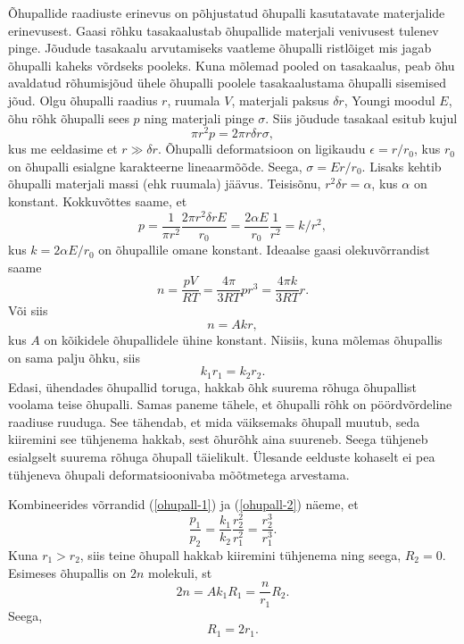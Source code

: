 \documentclass[10pt]{article}
\begin{document}
\solu
Õhupallide raadiuste erinevus on põhjustatud õhupalli kasutatavate materjalide erinevusest. Gaasi rõhku tasakaalustab õhupallide materjali venivusest tulenev pinge. Jõudude tasakaalu arvutamiseks vaatleme õhupalli ristlõiget mis jagab õhupalli kaheks võrdseks pooleks. Kuna mõlemad pooled on tasakaalus, peab õhu avaldatud rõhumisjõud ühele õhupalli poolele tasakaalustama õhupalli sisemised jõud. Olgu õhupalli raadius $r$, ruumala $V$, materjali paksus $\delta r$, Youngi moodul $E$, õhu rõhk õhupalli sees $p$ ning materjali pinge $\sigma$. Siis jõudude tasakaal esitub kujul
\[
\pi r^2 p = 2\pi r\delta r \sigma,
\]
kus me eeldasime et $r \gg \delta r$. Õhupalli deformatsioon on ligikaudu $\epsilon = r / r_0$, kus $r_0$ on õhupalli esialgne karakteerne lineaarmõõde. Seega, $\sigma = Er/r_0$. Lisaks kehtib õhupalli materjali massi (ehk ruumala) jäävus. Teisisõnu, $r^2\delta r = \alpha$, kus $\alpha$ on konstant. Kokkuvõttes saame, et
\begin{equation}
p = \frac{1}{\pi r^2} \frac{2\pi r^2\delta rE}{r_0} = \frac{2\alpha E}{r_0}\frac{1}{r^2}  = k/r^2,
\label{ohupall-1}
\end{equation}
kus $k = 2\alpha E/r_0$ on õhupallile omane konstant. Ideaalse gaasi olekuvõrrandist saame
\[
n = \frac{pV}{RT} = \frac{4\pi}{3RT}pr^3 = \frac{4\pi k}{3RT}r.
\]
Või siis
\[
n = Akr,
\]
kus $A$ on kõikidele õhupallidele ühine konstant. Niisiis, kuna mõlemas õhupallis on sama palju õhku, siis
\begin{equation}
k_1r_1 = k_2r_2.
\label{ohupall-2}
\end{equation}
Edasi, ühendades õhupallid toruga, hakkab õhk suurema rõhuga õhupallist voolama teise õhupalli. Samas paneme tähele, et õhupalli rõhk on pöördvõrdeline raadiuse ruuduga. See tähendab, et mida väiksemaks õhupall muutub, seda kiiremini see tühjenema hakkab, sest õhurõhk aina suureneb. Seega tühjeneb esialgselt suurema rõhuga õhupall täielikult. Ülesande eelduste kohaselt ei pea tühjeneva õhupali deformatsioonivaba mõõtmetega arvestama.

Kombineerides võrrandid (\ref{ohupall-1}) ja (\ref{ohupall-2}) näeme, et
\[
\frac{p_1}{p_2} = \frac{k_1}{k_2} \frac{r_2^2}{r_1^2} = \frac{r_2^3}{r_1^3}.
\]
Kuna $r_1 > r_2$, siis teine õhupall hakkab kiiremini tühjenema ning seega, $R_2 = 0$. Esimeses õhupallis on $2n$ molekuli, st
\[
2n = Ak_1 R_1 = \frac{n}{r_1}R_2.
\]
Seega,
\[
R_1 = 2r_1.
\]
\probend
\bigskip

\end{document}
